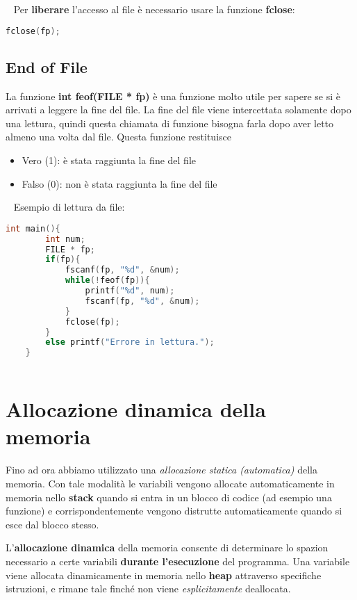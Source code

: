 \documentclass[a4paper,11pt,oneside]{book}
\begin{document}
~\newline
Per \textbf{liberare} l'accesso al file è necessario usare la funzione \textbf{fclose}:
\begin{lstlisting}[language=C]
    fclose(fp);
\end{lstlisting}

\section{End of File}
La funzione \textbf{int feof(FILE * fp)} è una funzione molto utile per sapere se si è arrivati a leggere la fine del file.
La fine del file viene intercettata solamente dopo una lettura, quindi questa chiamata di funzione bisogna farla dopo aver letto almeno una volta dal file.
Questa funzione restituisce
\begin{itemize}
    \item Vero (1): è stata raggiunta la fine del file 
    \item Falso (0): non è stata raggiunta la fine del file
\end{itemize}

~\newline 
Esempio di lettura da file:
\begin{lstlisting}[language=C]
    int main(){
        int num;
        FILE * fp;
        if(fp){
            fscanf(fp, "%d", &num);
            while(!feof(fp)){
                printf("%d", num);
                fscanf(fp, "%d", &num);
            }
            fclose(fp);
        }
        else printf("Errore in lettura.");
    }
    
\end{lstlisting}

\chapter{Allocazione dinamica della memoria}
Fino ad ora abbiamo utilizzato una \emph{allocazione statica (automatica)} della memoria.
Con tale modalità le variabili vengono allocate automaticamente in memoria nello \textbf{stack} quando si entra in un blocco di codice (ad esempio una funzione)
e corrispondentemente vengono distrutte automaticamente quando si esce dal blocco stesso.

L'\textbf{allocazione dinamica} della memoria consente di determinare lo spazion necessario a certe variabili \textbf{durante l'esecuzione} del programma.
Una variabile viene allocata dinamicamente in memoria nello \textbf{heap} attraverso specifiche istruzioni, e rimane tale finché non viene \emph{esplicitamente} deallocata.
\end{document}
